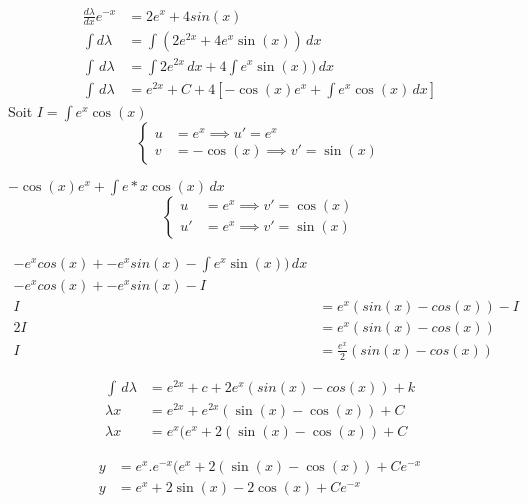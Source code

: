 \begin{align*}
    \frac{d\lambda}{dx}e^{-x} &= 2e^x + 4sin(x) \\
    \int d\lambda &= \int (2e^{2x} + 4e^x \sin(x)) \, dx \\
    \int \, d\lambda &= \int 2e^{2x} \, dx + 4\int e^x \sin(x)) \, dx \\
    \int \, d\lambda &= e^{2x} + C + 4 [-\cos(x)e^x + \int e^x\cos(x)\, dx]
\end{align*}
Soit $I = \int e^x\cos(x)\ $ \\
\[
\left\{
\begin{aligned}
    u &= e^x \implies u'= e^x  \\
    v &= -\cos(x) \implies v' = \sin(x)
\end{aligned}
\right.
\]

$-\cos(x)e^x + \int e*x\cos(x)\, dx$
\[
\left\{
\begin{aligned}
    u &= e^x \implies v'= \cos(x)  \\
    u' &= e^x \implies v' = \sin(x)
\end{aligned}
\right.
\]

\begin{align*}
    -e^xcos(x) + -e^xsin(x) - \int e^x \sin(x)) \, dx \\
    -e^xcos(x) + -e^xsin(x) - I \\
    I &= e^x(sin(x) - cos(x)) - I \\
    2I &= e^x(sin(x) - cos(x)) \\
    I &= \frac{e^x}{2}(sin(x) - cos(x)) 
\end{align*}

\begin{align*}
    \int \, d\lambda &= e^{2x} + c + 2e^x(sin(x) - cos(x)) + k \\
    \lambda x &= e^{2x} + e^{2x} (\sin(x) - \cos(x)) + C \\
    \lambda x &= e^{x} (e^{x} + 2(\sin(x) - \cos(x)) + C
\end{align*}

\begin{align*}
    y &= e^x.e^{-x} (e^{x} + 2(\sin(x) - \cos(x)) + Ce^{-x} \\
    y &= e^x + 2\sin(x) - 2\cos(x) + Ce^{-x}
\end{align*}
